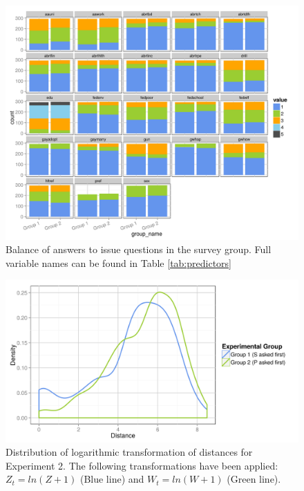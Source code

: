 \begin{figure}[ht!]
  \centering
  \includegraphics{figures/main/bal.png}
  \caption{Balance of answers to issue questions in the survey group. Full variable names can be found in Table \ref{tab:predictors}}
  \label{fig:bal}
\end{figure}

\begin{figure}[ht!]
  \centering
  \includegraphics{figures/main/dist_dista_log.png}
  \caption{Distribution of logarithmic transformation of distances for Experiment 2. The following transformations have been applied: $Z_t = ln(Z + 1)$ (Blue line) and $W_t = ln(W + 1)$ (Green line).}
  \label{fig:d_dist_log}
\end{figure}



\clearpage

